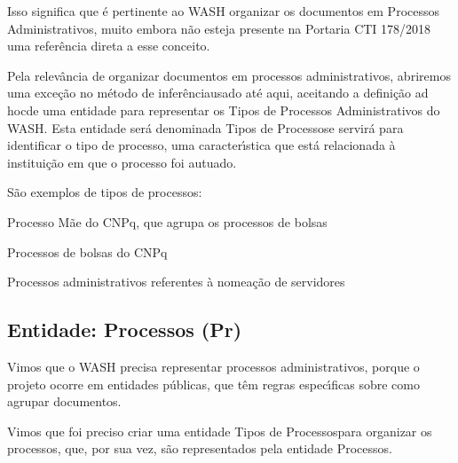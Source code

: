 \documentclass[
12pt,		%
openright,	%
twoside,  %
a4paper,			%
chapter=TITLE,		%
english,			%
french,				%
spanish,			%
brazil				%
]{USPSC-classe/USPSC}
\begin{document}
Isso significa que \'e pertinente ao WASH organizar os documentos em Processos Administrativos, muito embora n\~ao esteja presente na Portaria CTI 178/2018 uma refer\^encia direta a esse conceito.










Pela relev\^ancia de organizar documentos em processos administrativos, abriremos uma exce\c{c}\~ao no \textquotedbl m\'etodo de infer\^encia\textquotedbl  usado at\'e aqui, aceitando a defini\c{c}\~ao \textquotedbl ad hoc\textquotedbl  de uma entidade para representar os Tipos de Processos Administrativos do WASH. Esta entidade ser\'a denominada \textquotedbl Tipos de Processos\textquotedbl  e servir\'a para identificar o tipo de processo, uma caracter\'{\i}stica que est\'a relacionada \`a institui\c{c}\~ao em que o processo foi autuado.










S\~ao exemplos de tipos de processos:











\begin{alineas}
\item Processo M\~ae do CNPq, que agrupa os processos de bolsas
\item Processos de bolsas do CNPq
\item Processos administrativos referentes \`a nomea\c{c}\~ao de servidores
\end{alineas}

\subsection[Entidade: Processos (Pr)]{Entidade: Processos (Pr)}\label{Entidade: Processos (Pr)}
Vimos que o WASH precisa representar processos administrativos, porque o projeto ocorre em entidades p\'ublicas, que t\^em regras espec\'{\i}ficas sobre como agrupar documentos.










Vimos que foi preciso criar uma entidade \textquotedbl Tipos de Processos\textquotedbl  para organizar os processos, que, por sua vez, s\~ao representados pela entidade \textquotedbl Processos\textquotedbl .
\end{document}
